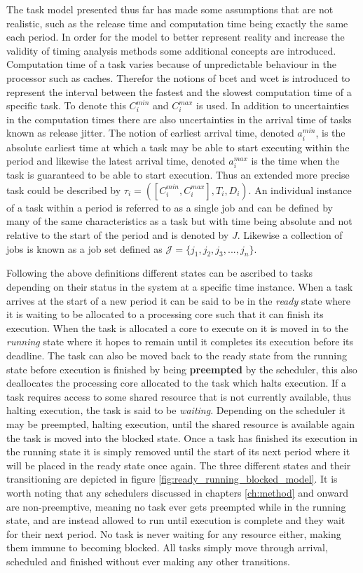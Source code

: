 \documentclass{kththesis}
\begin{document}
The task model presented thus far has made some assumptions that are not realistic, such as the
release time and computation time being exactly the same each period. In order for the model to
better represent reality and increase the validity of timing analysis methods some additional
concepts are introduced. Computation time of a task varies because of unpredictable behaviour in the
processor such as caches. Therefor the notions of \acrfull{bcet} and \acrfull{wcet} is introduced to
represent the interval between the fastest and the slowest computation time of a specific task. To
denote this $ C_i^{min} $ and $ C_i^{max} $ is used. In addition to uncertainties in the computation
times there are also uncertainties in the arrival time of tasks known as release jitter. The notion
of earliest arrival time, denoted $ a_i^{min} $, is the  absolute earliest time at which a task may
be able to start executing within the period and likewise the latest arrival time, denoted $
a_i^{max} $ is the time when the task is guaranteed to be able to start execution. Thus an extended
more precise task could be described by $ \tau_i = ( [C_i^{min}, C_i^{max}], T_i, D_i) $. An
individual instance of a task within a period is referred to as a single job and can be defined by
many of the same characteristics as a task but with time being absolute and not relative to the
start of the period and is denoted by $J$. Likewise a collection of jobs is known as a job set
defined as $ \mathcal{J} = \{j_1, j_2, j_3, ..., j_n\} $.

Following the above definitions different states can be ascribed to tasks depending on their
status in the system at a specific time instance. When a task arrives at the start of a new period
it can be said to be in the \textit{ready} state where it is waiting to be allocated to a processing
core such that it can finish its execution. When the task is allocated a core to execute on it is
moved in to the \textit{running} state where it hopes to remain until it completes its execution
before its deadline. The task can also be moved back to the ready state from the running state
before execution is finished by being \textbf{preempted} by the scheduler, this also deallocates the
processing core allocated to the task which halts execution. If a task requires access to
some shared resource that is not currently available, thus halting execution, the task is said to be
\textit{waiting}. Depending on the scheduler it may be preempted, halting execution, until the
shared resource is available again the task is moved into the blocked state. Once a task has
finished its execution in the running state it is simply removed until the start of its next period
where it will be placed in the ready state once again. The three different states
and their transitioning are depicted in figure \ref{fig:ready_running_blocked_model}. It is worth
noting that any schedulers discussed in chapters \ref{ch:method} and onward are non-preemptive,
meaning no task ever gets preempted while in the running state, and are instead allowed to run until
execution is complete and they wait for their next period. No task is never waiting for any resource
either, making them immune to becoming blocked. All tasks simply move through arrival, scheduled and
finished without ever making any other transitions. 
\end{document}
